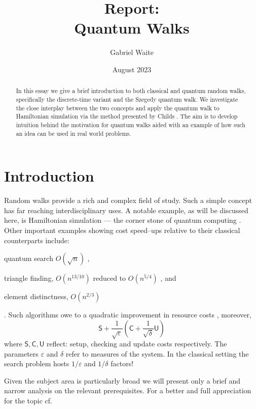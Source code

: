 \documentclass{article}
\title{Report:\\ Quantum Walks}
\author{Gabriel Waite}
\date{August 2023}
\begin{document}
\maketitle

\begin{abstract}
    {In this essay we give a brief introduction to both classical and quantum random walks, specifically the discrete-time variant and the Szegedy quantum walk. We investigate the close interplay between the two concepts and apply the quantum walk to Hamiltonian simulation via the method presented by Childs \cite{Childs09}. The aim is to develop intuition behind the motivation for quantum walks aided with an example of how such an idea can be used in real world problems.}
\end{abstract}

\section{Introduction}
Random walks provide a rich and complex field of study. Such a simple concept has far reaching interdisciplinary uses. A notable example, as will be discussed here, is Hamiltonian simulation ---  the corner stone of quantum computing \cite{Feynman86}. Other important examples showing cost speed--ups relative to their classical counterparts include:
\begin{inparaenum}[(a)]
    \item quantum search $O(\sqrt{n})$ \cite{Santha08}, 
    \item triangle finding, $O(n^{13/10})$ \cite{MSS05} reduced to $O(n^{5/4})$ \cite{LeGall14}, and
    \item element distinctness, $O(n^{2/3})$ \cite{Ambainis14QW}
\end{inparaenum}. Such algorithms owe to a quadratic improvement in resource costs \cite{DeWolf23}, moreover,
\begin{equation}
    \mathsf{S} + \frac{1}{\sqrt{\varepsilon}}\left(\mathsf{C} + \frac{1}{\sqrt{\delta}}\mathsf{U} \right)
\end{equation}
where $\mathsf{S},\mathsf{C},\mathsf{U}$ reflect: setup, checking and update costs respectively. The parameters $\varepsilon$ and $\delta$ refer to measures of the system. In the classical setting the search problem hosts $1/\varepsilon$ and $1/\delta$ factors! 


Given the subject area is particularly broad we will present only a brief and narrow analysis on the relevant prerequisites. For a better and full appreciation for the topic cf. \cite{Kempe03,Santha08,VenegasAndraca12}
\end{document}
